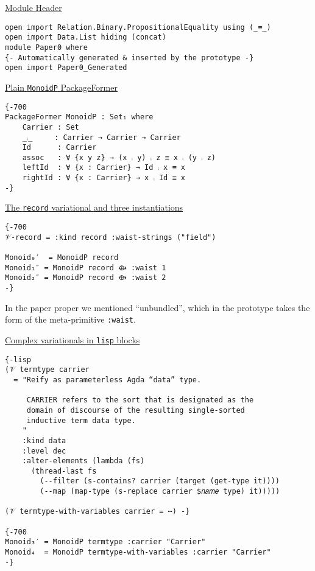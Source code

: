 \documentclass[sigplan,screen]{acmart}
\begin{document}
\vspace{0.3em}
\uline{Module Header}
\begin{tiny}
\begin{verbatim}
open import Relation.Binary.PropositionalEquality using (_≡_)
open import Data.List hiding (concat)
module Paper0 where
{- Automatically generated & inserted by the prototype -}
open import Paper0_Generated
\end{verbatim}
\end{tiny}

\uline{Plain \texttt{MonoidP} PackageFormer}
\begin{verbatim}
{-700
PackageFormer MonoidP : Set₁ where
    Carrier : Set
    _⨾_     : Carrier → Carrier → Carrier
    Id      : Carrier
    assoc   : ∀ {x y z} → (x ⨾ y) ⨾ z ≡ x ⨾ (y ⨾ z)
    leftId  : ∀ {x : Carrier} → Id ⨾ x ≡ x
    rightId : ∀ {x : Carrier} → x ⨾ Id ≡ x
-}
\end{verbatim}

\uline{The \texttt{record} variational and three instantiations}
\begin{verbatim}
{-700
𝒱-record = :kind record :waist-strings ("field")

Monoid₀′  = MonoidP record
Monoid₁″ = MonoidP record ⟴ :waist 1
Monoid₂″ = MonoidP record ⟴ :waist 2
-}
\end{verbatim}
In the paper proper we mentioned “unbundled”, which in the prototype
takes the form of the meta-primitive \texttt{:waist}.

\vspace{0.3em}
\uline{Complex variationals in \texttt{lisp} blocks}
\begin{small}
\begin{verbatim}
{-lisp
(𝒱 termtype carrier
  = "Reify as parameterless Agda “data” type.

     CARRIER refers to the sort that is designated as the
     domain of discourse of the resulting single-sorted
     inductive term data type.
    "
    :kind data
    :level dec
    :alter-elements (lambda (fs)
      (thread-last fs
        (--filter (s-contains? carrier (target (get-type it))))
        (--map (map-type (s-replace carrier $𝑛𝑎𝑚𝑒 type) it)))))

(𝒱 termtype-with-variables carrier = ⋯) -}

{-700
Monoid₃′ = MonoidP termtype :carrier "Carrier"
Monoid₄  = MonoidP termtype-with-variables :carrier "Carrier"
-}
\end{verbatim}
\end{small}
\end{document}
